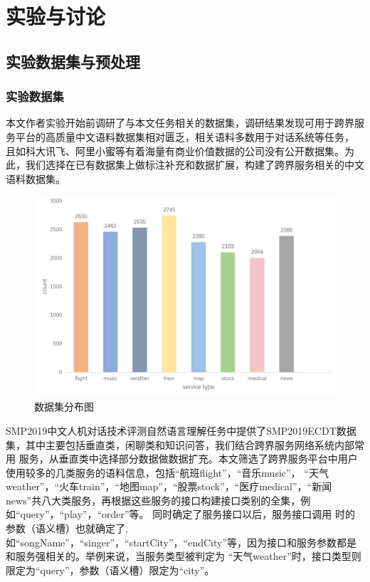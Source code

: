 \chapter{实验与讨论}

\section{实验数据集与预处理}
\subsection{实验数据集}
本文作者实验开始前调研了与本文任务相关的数据集，调研结果发现可用于跨界服务平台的高质量中文语料数据集相对匮乏，相关语料多数用于对话系统等任务，
且如科大讯飞、阿里小蜜等有着海量有商业价值数据的公司没有公开数据集。为此，我们选择在已有数据集上做标注补充和数据扩展，构建了跨界服务相关的中文
语料数据集。

\begin{figure}[htbp]
    \centering
    \includegraphics[width=15cm]{./images/count.jpg}
    \caption{数据集分布图}
    \label{fig:count}
  \end{figure}

SMP2019中文人机对话技术评测自然语言理解任务中提供了SMP2019ECDT数据集，其中主要包括垂直类，闲聊类和知识问答，我们结合跨界服务网络系统内部常用
服务，从垂直类中选择部分数据做数据扩充。本文筛选了跨界服务平台中用户使用较多的几类服务的语料信息，包括“航班flight”，“音乐music”，
“天气weather”，“火车train”，“地图map”，“股票stock”，“医疗medical”，“新闻news”共八大类服务，再根据这些服务的接口构建接口类别的全集，例如“query”，“play”，“order”等。
同时确定了服务接口以后，服务接口调用
时的参数（语义槽）也就确定了,如“songName”，“singer”，“startCity”，“endCity”等，因为接口和服务参数都是和服务强相关的。举例来说，当服务类型被判定为
“天气weather”时，接口类型则限定为“query”，参数（语义槽）限定为“city”。

